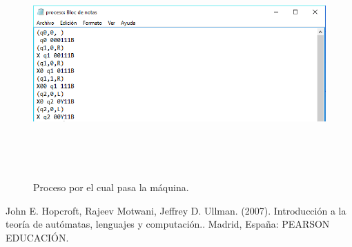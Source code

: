 \documentclass[12pt]{article}
\begin{document}
\begin{figure}[H]
\begin{center}
\includegraphics[width=\textwidth, height=8cm]{manual_turing_proceso}
\label{ }
\caption{Proceso por el cual pasa la máquina.}
\end{center}
\end{figure}

\begin{thebibliography}{9}
   John E. Hopcroft, Rajeev Motwani, Jeffrey D. Ullman. (2007). Introducción a la teoría de autómatas, lenguajes y computación.. Madrid, España: PEARSON EDUCACIÓN.
\end{thebibliography}

%
%
\end{document}
